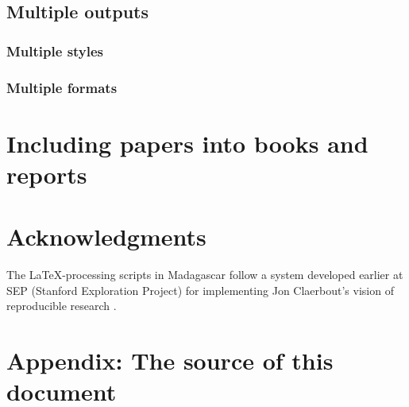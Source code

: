 \subsection{Multiple outputs}

\subsubsection{Multiple styles}

\subsubsection{Multiple formats}

\section{Including papers into books and reports}

\section{Acknowledgments}

The \LaTeX-processing scripts in Madagascar follow a system developed
earlier at SEP (Stanford Exploration Project) for implementing Jon
Claerbout's vision of reproducible research \cite[]{sep}.




\appendix
\section{Appendix: The source of this document}



